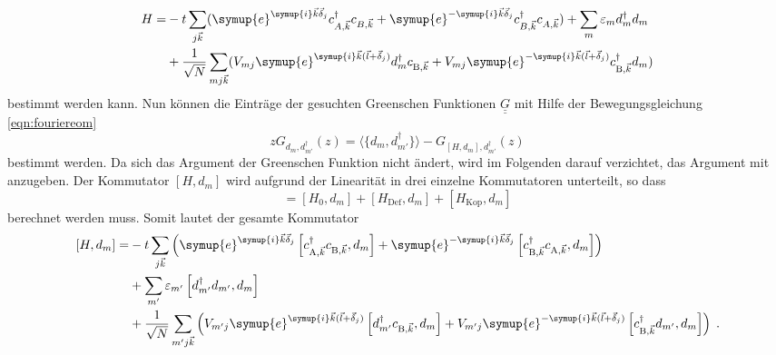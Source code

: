 \begin{equation*}
    \begin{split}
        H = &-t \sum_{j \vec{k}} ( \symup{e}^{\symup{i}\vec{k}\vec{\delta}_j}c^\dagger_{A,\vec{k}} c_{B,\vec{k}} + 
            \symup{e}^{-\symup{i}\vec{k}\vec{\delta}_j} c^\dagger_{B,\vec{k}}c_{A,\vec{k}}) + \sum_m \varepsilon_m d_m^\dagger d_m \\
            &+ \frac{1}{\sqrt{N}}\sum_{mj\vec{k}} ( V_{mj}  \symup{e}^{\symup{i}\vec{k}(\vec{l}+\vec{\delta}_j)} d_m^\dagger c_{\text{B},\vec{k}} 
            + V_{mj} \symup{e}^{-\symup{i}\vec{k}(\vec{l}+\vec{\delta}_j)}c^\dagger_{\text{B},\vec{k}} d_m )
    \end{split}
\end{equation*}
bestimmt werden kann.
Nun können die Einträge der gesuchten Greenschen Funktionen $\underline{\underline{G}}$ mit Hilfe der Bewegungsgleichung \eqref{eqn:fouriereom} 
\begin{equation}
    zG_{d_m, d_{m'}^\dagger}(z) = \langle \{ d_m, d_{m'}^\dagger \} \rangle - G_{[H,d_m], d_{m'}^\dagger} (z) \label{eqn:eomgreenansatz}
\end{equation}
bestimmt werden.
Da sich das Argument der Greenschen Funktion nicht ändert, wird im Folgenden darauf verzichtet, das Argument mit anzugeben.
Der Kommutator $[H,d_m]$ wird aufgrund der Linearität in drei einzelne Kommutatoren unterteilt, so dass
\begin{equation*}
    [H,d_m] = [H_0,d_m] + [H_\text{Def},d_m] +[H_\text{Kop},d_m] 
\end{equation*}
berechnet werden muss.
Somit lautet der gesamte Kommutator
\begin{equation}
    \begin{split}
    [H, d_m] = &-t \sum_{j\vec{k}} \left ( \symup{e}^{\symup{i}\vec{k} \vec{\delta}_j}      \left [ c^\dagger_{\text{A},\vec{k}}  
        c_{\text{B},\vec{k}}, d_m \right ] + \symup{e}^{-\symup{i}\vec{k} \vec{\delta}_j}   \left [ c^\dagger_{\text{B},\vec{k}}  
        c_{\text{A},\vec{k}}, d_m \right ]  \right ) \\
        &+\sum_{m'} \varepsilon_{m'} \left [ d^\dagger_{m'} d_{m'}, d_{m} \right ] \\
        &+ \frac{1}{\sqrt{N}} \sum_{m'j\vec{k}} \left ( V_{m'j} \symup{e}^{\symup{i}\vec{k} (\vec{l} + \vec{\delta}_j)}   
        \left [d^\dagger_{m'}c_{\text{B}, \vec{k}}, d_m \right ]
        +  V_{m'j} \symup{e}^{-\symup{i}\vec{k} (\vec{l} + \vec{\delta}_j)}   
        \left [c^\dagger_{\text{B},\vec{k}} d_{m'},  d_m \right ]
        \right ) \; . \label{eqn:commutator_H_dm}
    \end{split}
\end{equation} 
